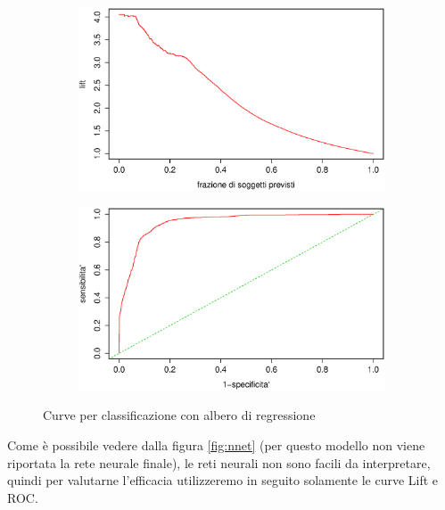 \begin{figure}[H]
  \begin{subfigure}{0.4\textwidth}
    \includegraphics[width=\columnwidth]{images/class/lift-tree.eps}
  \end{subfigure}
  \hspace*{\fill}
  \begin{subfigure}{0.4\textwidth}
    \includegraphics[width=\columnwidth]{images/class/roc-tree.eps}
  \end{subfigure}
  \caption{Curve per classificazione con albero di regressione}
  \label{fig:class-reg-1og}
\end{figure}

Come è possibile vedere dalla figura \ref{fig:nnet} (per questo modello non
viene riportata la rete neurale finale), le reti neurali non sono facili da
interpretare, quindi per valutarne l'efficacia utilizzeremo in seguito
solamente le curve Lift e ROC.
